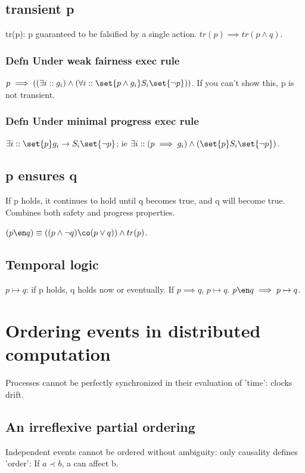 \documentclass[oneside, article]{memoir}
\begin{document}
\subsection{transient p}
tr(p): p guaranteed to be falsified by a single action. $tr(p) \implies tr(p \land q)$.

\subsubsection{Defn Under weak fairness exec rule}
$p \implies ((\exists i::g_i) \land (\forall i:: \set{p \land g_i} S_i \set{\lnot p}))$. If you can't show this, p is not transient.

\subsubsection{Defn Under minimal progress exec rule}
$\exists i:: \set{p} g_i \to S_i \set{\lnot p}$; ie $\exists i:: (p \implies g_i) \land (\set{p} S_i \set{\lnot p})$.

\subsection{p ensures q}
If p holds, it continues to hold until q becomes true, and q will become true. Combines both safety and progress properties.

$(p \en q) \equiv ((p \land \lnot q) \co (p \lor q)) \land tr(p)$.

\subsection{Temporal logic}
$p \mapsto q$: if p holds, q holds now or eventually. If $p \implies q$, $p \mapsto q$. $p \en q \implies p \mapsto q$.

\tbc

\section{Ordering events in distributed computation}
Processes cannot be perfectly synchronized in their evaluation of 'time': clocks drift.

\subsection{An irreflexive partial ordering}
Independent events cannot be ordered without ambiguity: only causality defines 'order': If $a \prec b$, a can affect b.
\end{document}
